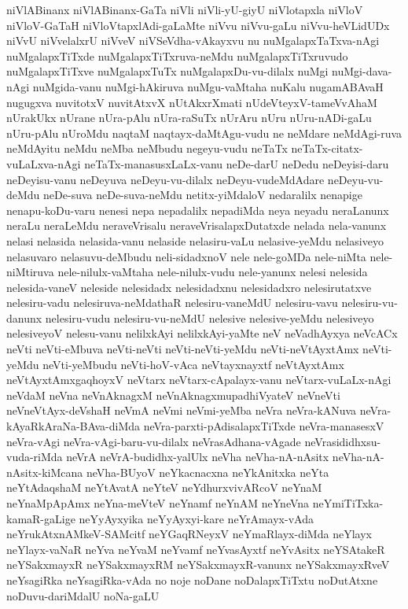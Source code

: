 {niVlABinanx
niVlABinanx-GaTa
niVli
niVli-yU-giyU
niVlotapxla
niVloV
niVloV-GaTaH
niVloVtapxlAdi-gaLaMte
niVvu
niVvu-gaLu
niVvu-heVLidUDx
niVvU
niVvelalxrU
niVveV
niVSeVdha-vAkayxvu
nu
nuMgalapxTaTxva-nAgi
nuMgalapxTiTxde
nuMgalapxTiTxruva-neMdu
nuMgalapxTiTxruvudo
nuMgalapxTiTxve
nuMgalapxTuTx
nuMgalapxDu-vu-dilalx
nuMgi
nuMgi-dava-nAgi
nuMgida-vanu
nuMgi-hAkiruva
nuMgu-vaMtaha
nuKalu
nugamABAvaH
nugugxva
nuvitotxV
nuvitAtxvX
nUtAkxrXmati
nUdeVteyxV-tameVvAhaM
nUrakUkx
nUrane
nUra-pAlu
nUra-raSuTx
nUrAru
nUru
nUru-nADi-gaLu
nUru-pAlu
nUroMdu
naqtaM
naqtayx-daMtAgu-vudu
ne
neMdare
neMdAgi-ruva
neMdAyitu
neMdu
neMba
neMbudu
negeyu-vudu
neTaTx
neTaTx-citatx-vuLaLxva-nAgi
neTaTx-manasusxLaLx-vanu
neDe-darU
neDedu
neDeyisi-daru
neDeyisu-vanu
neDeyuva
neDeyu-vu-dilalx
neDeyu-vudeMdAdare
neDeyu-vu-deMdu
neDe-suva
neDe-suva-neMdu
netitx-yiMdaloV
nedaralilx
nenapige
nenapu-koDu-varu
nenesi
nepa
nepadalilx
nepadiMda
neya
neyadu
neraLanunx
neraLu
neraLeMdu
neraveVrisalu
neraveVrisalapxDutatxde
nelada
nela-vanunx
nelasi
nelasida
nelasida-vanu
nelaside
nelasiru-vaLu
nelasive-yeMdu
nelasiveyo
nelasuvaro
nelasuvu-deMbudu
neli-sidadxnoV
nele
nele-goMDa
nele-niMta
nele-niMtiruva
nele-nilulx-vaMtaha
nele-nilulx-vudu
nele-yanunx
nelesi
nelesida
nelesida-vaneV
neleside
nelesidadx
nelesidadxnu
nelesidadxro
nelesirutatxve
nelesiru-vadu
nelesiruva-neMdathaR
nelesiru-vaneMdU
nelesiru-vavu
nelesiru-vu-danunx
nelesiru-vudu
nelesiru-vu-neMdU
nelesive
nelesive-yeMdu
nelesiveyo
nelesiveyoV
nelesu-vanu
nelilxkAyi
nelilxkAyi-yaMte
neV
neVadhAyxya
neVcACx
neVti
neVti-eMbuva
neVti-neVti
neVti-neVti-yeMdu
neVti-neVtAyxtAmx
neVti-yeMdu
neVti-yeMbudu
neVti-hoV-vAca
neVtayxnayxtf
neVtAyxtAmx
neVtAyxtAmxgaqhoyxV
neVtarx
neVtarx-cApalayx-vanu
neVtarx-vuLaLx-nAgi
neVdaM
neVna
neVnAknagxM
neVnAknagxmupadhiVyateV
neVneVti
neVneVtAyx-deVshaH
neVmA
neVmi
neVmi-yeMba
neVra
neVra-kANuva
neVra-kAyaRkAraNa-BAva-diMda
neVra-parxti-pAdisalapxTiTxde
neVra-manasesxV
neVra-vAgi
neVra-vAgi-baru-vu-dilalx
neVrasAdhana-vAgade
neVrasididhxsu-vuda-riMda
neVrA
neVrA-budidhx-yalUlx
neVha
neVha-nA-nAsitx
neVha-nA-nAsitx-kiMcana
neVha-BUyoV
neYkacnacxna
neYkAnitxka
neYta
neYtAdaqshaM
neYtAvatA
neYteV
neYdhurxvivARcoV
neYnaM
neYnaMpApAmx
neYna-meVteV
neYnamf
neYnAM
neYneVna
neYmiTiTxka-kamaR-gaLige
neYyAyxyika
neYyAyxyi-kare
neYrAmayx-vAda
neYrukAtxnAMkeV-SAMcitf
neYGaqRNeyxV
neYmaRlayx-diMda
neYlayx
neYlayx-vaNaR
neYva
neYvaM
neYvamf
neYvasAyxtf
neYvAsitx
neYSAtakeR
neYSakxmayxR
neYSakxmayxRM
neYSakxmayxR-vanunx
neYSakxmayxRveV
neYsagiRka
neYsagiRka-vAda
no
noje
noDane
noDalapxTiTxtu
noDutAtxne
noDuvu-dariMdalU
noNa-gaLU
}
